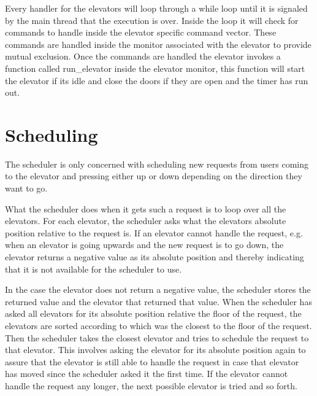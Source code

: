 \documentclass[10pt,a4paper]{article}
\begin{document}
Every handler for the elevators will loop through a while loop until it is signaled by the main thread that the execution is over. Inside the loop it will check for commands to handle inside the elevator specific command vector. These commands are handled inside the monitor associated with the elevator to provide mutual exclusion. Once the commands are handled the elevator invokes a function called run\_elevator inside the elevator monitor, this function will start the elevator if its idle and close the doors if they are open and the timer has run out.


\section{Scheduling}
\label{sec:scheduling}

The scheduler is only concerned with scheduling new requests from users coming to the elevator and pressing either up or down depending on the direction they want to go.

What the scheduler does when it gets such a request is to loop over all the elevators. For each elevator, the scheduler asks what the elevators absolute position relative to the request is. If an elevator cannot handle the request, e.g. when an elevator is going upwards and the new request is to go down, the elevator returns a negative value as its absolute position and thereby indicating that it is not available for the scheduler to use.

In the case the elevator does not return a negative value, the scheduler stores the returned value and the elevator that returned that value. When the scheduler has asked all elevators for its absolute position relative the floor of the request, the elevators are sorted according to which was the closest to the floor of the request. Then the scheduler takes the closest elevator and tries to schedule the request to that elevator. This involves asking the elevator for its absolute position
again to assure that the elevator is still able to handle the request in case that elevator has moved since the scheduler asked it the first time. If the elevator cannot handle the request any longer, the next possible elevator is tried and so forth.
\end{document}
